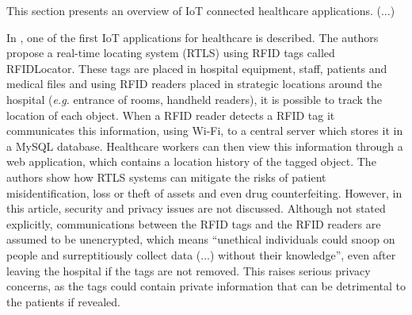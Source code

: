 
 

This section presents an overview of \acs{IoT} connected healthcare applications. (...) \bigskip
%

In \cite{Fuhrer2006}, one of the first \acs{IoT} applications for healthcare is described. The authors propose a real-time locating system (RTLS) using \acs{RFID} tags called RFIDLocator. These tags are placed in hospital equipment, staff, patients and medical files and using \acs{RFID} readers placed in strategic locations around the hospital (\textit{e.g.} entrance of rooms, handheld readers), it is possible to track the location of each object. When a \acs{RFID} reader detects a \acs{RFID} tag it communicates this information, using Wi-Fi, to a central server which stores it in a MySQL database. Healthcare workers can then view this information through a web application, which contains a location history of the tagged object. The authors show how RTLS systems can mitigate the risks of patient misidentification, loss or theft of assets and even drug counterfeiting. However, in this article, security and privacy issues are not discussed. Although not stated explicitly, communications between the RFID tags and the RFID readers are assumed to be unencrypted, which means ``unethical individuals could snoop on people and surreptitiously collect data (...) without their knowledge'', even after leaving the hospital if the tags are not removed. This raises serious privacy concerns, as the tags could contain private information that can be detrimental to the patients if revealed.

